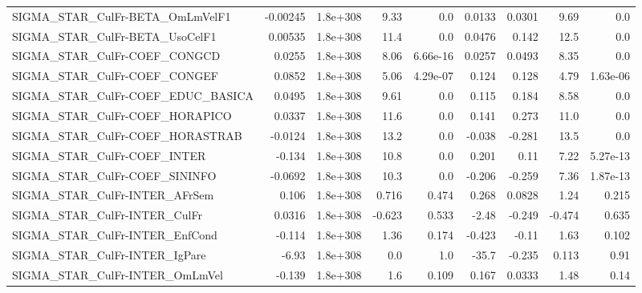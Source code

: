 \begin{tabular}{lrrrrrrrr}
SIGMA\_STAR\_CulFr-BETA\_OmLmVelF1       &    -0.00245 &     1.8e+308 &    9.33 &      0.0 &     0.0133 &      0.0301 &         9.69 &           0.0 \\
SIGMA\_STAR\_CulFr-BETA\_UsoCelF1        &     0.00535 &     1.8e+308 &    11.4 &      0.0 &     0.0476 &       0.142 &         12.5 &           0.0 \\
SIGMA\_STAR\_CulFr-COEF\_CONGCD          &      0.0255 &     1.8e+308 &    8.06 & 6.66e-16 &     0.0257 &      0.0493 &         8.35 &           0.0 \\
SIGMA\_STAR\_CulFr-COEF\_CONGEF          &      0.0852 &     1.8e+308 &    5.06 & 4.29e-07 &      0.124 &       0.128 &         4.79 &      1.63e-06 \\
SIGMA\_STAR\_CulFr-COEF\_EDUC\_BASICA     &      0.0495 &     1.8e+308 &    9.61 &      0.0 &      0.115 &       0.184 &         8.58 &           0.0 \\
SIGMA\_STAR\_CulFr-COEF\_HORAPICO        &      0.0337 &     1.8e+308 &    11.6 &      0.0 &      0.141 &       0.273 &         11.0 &           0.0 \\
SIGMA\_STAR\_CulFr-COEF\_HORASTRAB       &     -0.0124 &     1.8e+308 &    13.2 &      0.0 &     -0.038 &      -0.281 &         13.5 &           0.0 \\
SIGMA\_STAR\_CulFr-COEF\_INTER           &      -0.134 &     1.8e+308 &    10.8 &      0.0 &      0.201 &        0.11 &         7.22 &      5.27e-13 \\
SIGMA\_STAR\_CulFr-COEF\_SININFO         &     -0.0692 &     1.8e+308 &    10.3 &      0.0 &     -0.206 &      -0.259 &         7.36 &      1.87e-13 \\
SIGMA\_STAR\_CulFr-INTER\_AFrSem         &       0.106 &     1.8e+308 &   0.716 &    0.474 &      0.268 &      0.0828 &         1.24 &         0.215 \\
SIGMA\_STAR\_CulFr-INTER\_CulFr          &      0.0316 &     1.8e+308 &  -0.623 &    0.533 &      -2.48 &      -0.249 &       -0.474 &         0.635 \\
SIGMA\_STAR\_CulFr-INTER\_EnfCond        &      -0.114 &     1.8e+308 &    1.36 &    0.174 &     -0.423 &       -0.11 &         1.63 &         0.102 \\
SIGMA\_STAR\_CulFr-INTER\_IgPare         &       -6.93 &     1.8e+308 &     0.0 &      1.0 &      -35.7 &      -0.235 &        0.113 &          0.91 \\
SIGMA\_STAR\_CulFr-INTER\_OmLmVel        &      -0.139 &     1.8e+308 &     1.6 &    0.109 &      0.167 &      0.0333 &         1.48 &          0.14 \\

\end{tabular}
